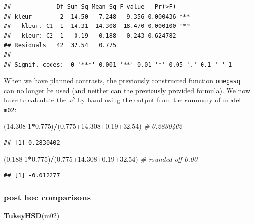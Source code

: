 \documentclass[
]{book}
\newenvironment{Shaded}{\begin{snugshade}}{\end{snugshade}}
\newcommand{\CommentTok}[1]{\textcolor[rgb]{0.56,0.35,0.01}{\textit{#1}}}
\newcommand{\DecValTok}[1]{\textcolor[rgb]{0.00,0.00,0.81}{#1}}
\newcommand{\FloatTok}[1]{\textcolor[rgb]{0.00,0.00,0.81}{#1}}
\newcommand{\FunctionTok}[1]{\textcolor[rgb]{0.13,0.29,0.53}{\textbf{#1}}}
\newcommand{\NormalTok}[1]{#1}
\newcommand{\SpecialCharTok}[1]{\textcolor[rgb]{0.81,0.36,0.00}{\textbf{#1}}}
\begin{document}
\begin{verbatim}
##             Df Sum Sq Mean Sq F value   Pr(>F)    
## kleur        2  14.50   7.248   9.356 0.000436 ***
##   kleur: C1  1  14.31  14.308  18.470 0.000100 ***
##   kleur: C2  1   0.19   0.188   0.243 0.624782    
## Residuals   42  32.54   0.775                     
## ---
## Signif. codes:  0 '***' 0.001 '**' 0.01 '*' 0.05 '.' 0.1 ' ' 1
\end{verbatim}

When we have planned contrasts, the previously constructed function \texttt{omegasq} can no longer be used (and neither can the previously provided formula). We now have to calculate the \(\omega^2\) by hand using the output from the summary of model \texttt{m02}:

\begin{Shaded}
\begin{Highlighting}[]
\NormalTok{(}\FloatTok{14.308}\DecValTok{{-}1}\SpecialCharTok{*}\FloatTok{0.775}\NormalTok{)}\SpecialCharTok{/}\NormalTok{(}\FloatTok{0.775+14.308+0.19+32.54}\NormalTok{) }\CommentTok{\# 0.2830402}
\end{Highlighting}
\end{Shaded}

\begin{verbatim}
## [1] 0.2830402
\end{verbatim}

\begin{Shaded}
\begin{Highlighting}[]
\NormalTok{(}\FloatTok{0.188}\DecValTok{{-}1}\SpecialCharTok{*}\FloatTok{0.775}\NormalTok{)}\SpecialCharTok{/}\NormalTok{(}\FloatTok{0.775+14.308+0.19+32.54}\NormalTok{) }\CommentTok{\# rounded off 0.00}
\end{Highlighting}
\end{Shaded}

\begin{verbatim}
## [1] -0.012277
\end{verbatim}

\subsubsection{post hoc comparisons}\label{r-post-hoc-comparisons}

\begin{Shaded}
\begin{Highlighting}[]
\FunctionTok{TukeyHSD}\NormalTok{(m02)}
\end{Highlighting}
\end{Shaded}
\end{document}
